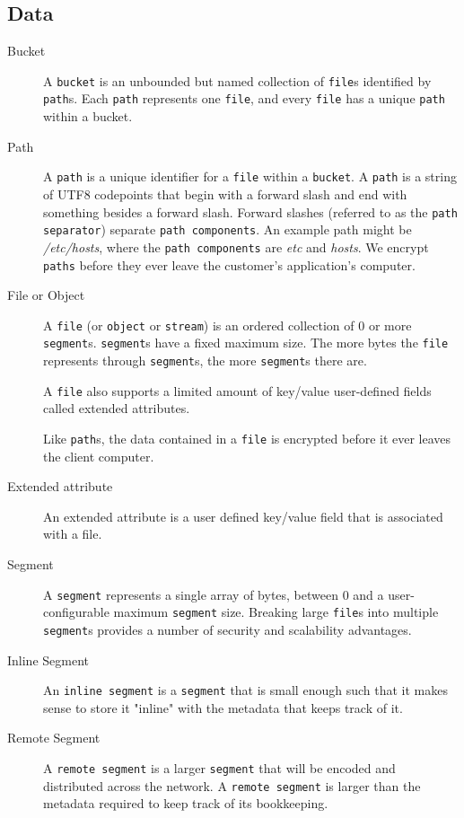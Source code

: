 \documentclass[11pt,fleqn,openany]{book}
\newcommand{\x}[1]{{\tt #1}} \newcommand{\code}[1]{{\em #1}}
\begin{document}
\subsection{Data}

\begin{description}
\item[Bucket] A \x{bucket} is an unbounded but named
collection of \x{file}s identified by \x{path}s. Each \x{path} represents one
\x{file}, and every \x{file} has a unique \x{path} within a bucket.

\item[Path] A \x{path} is a unique identifier for a \x{file} within a
\x{bucket}. A \x{path} is a string of UTF8 codepoints that begin with a forward
slash and end with something besides a forward slash. Forward
slashes (referred to as the \x{path separator}) separate \x{path components}.
An example path might be \code{/etc/hosts}, where the \x{path components} are
\code{etc} and \code{hosts}.
We encrypt \x{paths} before they ever leave the customer's application's
computer.

\item[File or Object] A \x{file} (or \x{object} or \x{stream}) is an ordered
collection of 0 or more \x{segment}s. \x{segment}s have a fixed maximum size.
The more bytes the \x{file} represents through \x{segment}s, the more
\x{segment}s there are.

A \x{file} also supports a limited amount of key/value user-defined fields
called extended attributes.

Like \x{path}s, the data contained in a \x{file} is encrypted before it ever
leaves the client computer.

\item[Extended attribute] An extended attribute is a user defined key/value
field that is associated with a file.

\item[Segment] A \x{segment} represents a single array of bytes, between 0 and a
user-configurable maximum \x{segment} size. Breaking large \x{file}s into
multiple \x{segment}s provides a number of security and scalability advantages.

\item[Inline Segment] An \x{inline segment} is a \x{segment} that is small
enough such that it makes sense to store it "inline" with the metadata that
keeps track of it.

\item[Remote Segment] A \x{remote segment} is a larger \x{segment} that will be
encoded and distributed across the network. A \x{remote segment} is larger than
the metadata required to keep track of its bookkeeping.


\end{description}
\end{document}
